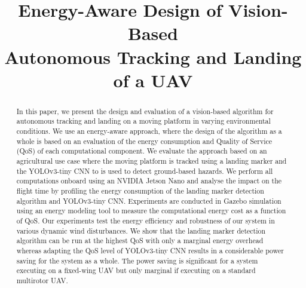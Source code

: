 \documentclass[conference]{IEEEtran}
\begin{document}
\title{Energy-Aware Design of Vision-Based\\Autonomous Tracking and Landing of a UAV} 

\author{
}

\maketitle


\begin{abstract}


In this paper, we present the design and evaluation of a
vision-based algorithm for autonomous tracking and landing on a moving platform 
in varying environmental conditions. %
%
We use an energy-aware approach, where the design of the algorithm as a whole is based on
an evaluation of the energy consumption and Quality of Service (QoS) of each computational component.
%
We evaluate the approach based on an agricultural use case where
the moving platform is tracked using 
a landing marker %
and the YOLOv3-tiny CNN to is used to detect ground-based hazards. We
perform all computations onboard using an NVIDIA Jetson Nano and analyse the impact on the flight time by profiling the energy consumption of the
landing marker detection algorithm and YOLOv3-tiny CNN. Experiments are conducted in Gazebo simulation using an energy modeling tool to measure the computational energy cost as a function of QoS. Our experiments test the energy efficiency and robustness of our system in various dynamic wind disturbances. We show that the landing marker detection algorithm can be run at the highest QoS with only a marginal energy overhead whereas adapting the QoS level of YOLOv3-tiny CNN results in a considerable power saving for the system as a whole. The
power saving is significant for a system executing on a fixed-wing UAV but only marginal if executing on a standard multirotor UAV.

\end{abstract}

%
\IEEEpeerreviewmaketitle
\end{document}

